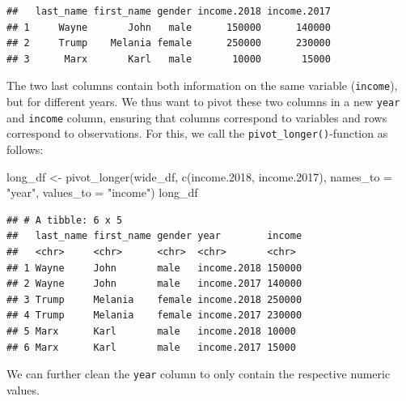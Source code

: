 \documentclass[
  12pt,
]{style/krantz}
\newenvironment{Shaded}{\begin{snugshade}}{\end{snugshade}}
\newcommand{\AttributeTok}[1]{\textcolor[rgb]{0.77,0.63,0.00}{#1}}
\newcommand{\FloatTok}[1]{\textcolor[rgb]{0.00,0.00,0.81}{#1}}
\newcommand{\FunctionTok}[1]{\textcolor[rgb]{0.00,0.00,0.00}{#1}}
\newcommand{\NormalTok}[1]{#1}
\newcommand{\OtherTok}[1]{\textcolor[rgb]{0.56,0.35,0.01}{#1}}
\newcommand{\SpecialCharTok}[1]{\textcolor[rgb]{0.00,0.00,0.00}{#1}}
\newcommand{\StringTok}[1]{\textcolor[rgb]{0.31,0.60,0.02}{#1}}
\begin{document}
\begin{verbatim}
##   last_name first_name gender income.2018 income.2017
## 1     Wayne       John   male      150000      140000
## 2     Trump    Melania female      250000      230000
## 3      Marx       Karl   male       10000       15000
\end{verbatim}

The two last columns contain both information on the same variable (\texttt{income}), but for different years. We thus want to pivot these two columns in a new \texttt{year} and \texttt{income} column, ensuring that columns correspond to variables and rows correspond to observations. For this, we call the \texttt{pivot\_longer()}-function as follows:

\begin{Shaded}
\begin{Highlighting}[]
\NormalTok{long\_df }\OtherTok{\textless{}{-}} \FunctionTok{pivot\_longer}\NormalTok{(wide\_df, }\FunctionTok{c}\NormalTok{(income}\FloatTok{.2018}\NormalTok{, income}\FloatTok{.2017}\NormalTok{), }\AttributeTok{names\_to =} \StringTok{"year"}\NormalTok{, }\AttributeTok{values\_to =} \StringTok{"income"}\NormalTok{)}
\NormalTok{long\_df}
\end{Highlighting}
\end{Shaded}

\begin{verbatim}
## # A tibble: 6 x 5
##   last_name first_name gender year        income
##   <chr>     <chr>      <chr>  <chr>       <chr> 
## 1 Wayne     John       male   income.2018 150000
## 2 Wayne     John       male   income.2017 140000
## 3 Trump     Melania    female income.2018 250000
## 4 Trump     Melania    female income.2017 230000
## 5 Marx      Karl       male   income.2018 10000 
## 6 Marx      Karl       male   income.2017 15000
\end{verbatim}

We can further clean the \texttt{year} column to only contain the respective numeric values.

\begin{Shaded}
\end{Shaded}
\end{document}
